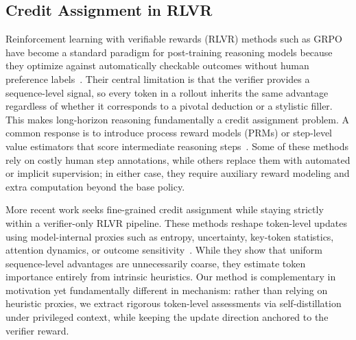 \subsection{Credit Assignment in RLVR}
Reinforcement learning with verifiable rewards (RLVR) methods such as GRPO~\citep{grpo} have become a standard paradigm for post-training reasoning models because they optimize against automatically checkable outcomes without human preference labels~\citep{grpo,deepseekr1}. Their central limitation is that the verifier provides a sequence-level signal, so every token in a rollout inherits the same advantage regardless of whether it corresponds to a pivotal deduction or a stylistic filler. This makes long-horizon reasoning fundamentally a credit assignment problem. A common response is to introduce process reward models (PRMs) or step-level value estimators that score intermediate reasoning steps~\citep{lightman2024lets,wang2024math,yang2025testtimepromptintervention,luo2024improve,chen2024step,zhang2024generative,yang2025dynamicearlyexitreasoning,dai2025sgrpoearlyexitreinforcement,cui2025process}. Some of these methods rely on costly human step annotations, while others replace them with automated or implicit supervision; in either case, they require auxiliary reward modeling and extra computation beyond the base policy.

More recent work seeks fine-grained credit assignment while staying strictly within a verifier-only RLVR pipeline. These methods reshape token-level updates using model-internal proxies such as entropy, uncertainty, key-token statistics, attention dynamics, or outcome sensitivity~\citep{cheng2026reasoning,wangbeyond,chen2025seed,sun2025ktaemodelfreealgorithmkeytokens,xie2025unlocking,li2025attention,chen2025beyond,li2026outcome}. While they show that uniform sequence-level advantages are unnecessarily coarse, they estimate token importance entirely from intrinsic heuristics. Our method is complementary in motivation yet fundamentally different in mechanism: rather than relying on heuristic proxies, we extract rigorous token-level assessments via self-distillation under privileged context, while keeping the update direction anchored to the verifier reward.

